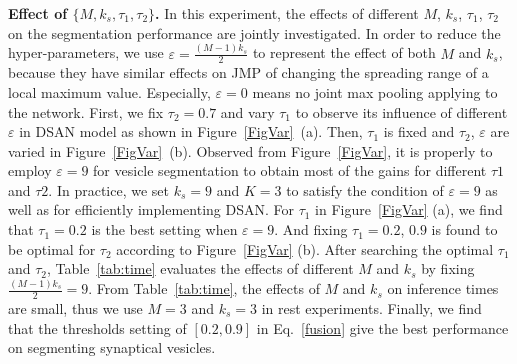 \noindent\textbf{Effect of $\{M, k_s, \tau_1, \tau_2\}$.}
In this experiment, the effects of different $M$, $k_s$, $\tau_1$, $\tau_2$ on the segmentation performance are jointly investigated.
In order to reduce the hyper-parameters, we use $\varepsilon=\frac{(M-1)k_s}{2}$ to represent the effect of both $M$ and $k_s$, because they have similar effects on JMP of changing the spreading range of a local maximum value.
Especially, $\varepsilon=0$ means no joint max pooling applying to the network.
First, we fix $\tau_2=0.7$ and vary $\tau_1$ to observe its influence of different $\varepsilon$ in DSAN model as shown in Figure~\ref{FigVar}~(a).
Then, $\tau_1$ is fixed and $\tau_2$, $\varepsilon$ are varied in Figure~\ref{FigVar}~(b).
Observed from Figure~\ref{FigVar}, it is properly to employ $\varepsilon=9$ for vesicle segmentation to obtain most of the gains for different $\tau1$ and $\tau2$.
In practice, we set $k_s=9$ and $K=3$ to satisfy the condition of $\varepsilon=9$ as well as for efficiently implementing DSAN.
For $\tau_1$ in Figure~\ref{FigVar} (a), we find that $\tau_1=0.2$ is the best setting when $\varepsilon=9$.
And fixing $\tau_1=0.2$, $0.9$ is found to be optimal for $\tau_2$ according to Figure~\ref{FigVar} (b).
After searching the optimal $\tau_1$ and $\tau_2$, Table~\ref{tab:time} evaluates the effects of different $M$ and $k_s$ by fixing $\frac{(M-1)k_s}{2}=9$.
From Table~\ref{tab:time}, the effects of $M$ and $k_s$ on inference times are small, thus we use $M=3$ and $k_s=3$ in rest experiments.
Finally, we find that the thresholds setting of $[0.2, 0.9]$ in Eq.~\ref{fusion} give the best performance on segmenting synaptical vesicles.


